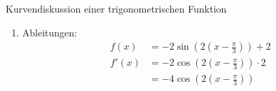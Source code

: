 \begin{bsp}{Kurvendiskussion einer trigonometrischen Funktion}{}
\begin{enumerate}
\begin{itemize}
\begin{equation*}
\begin{split}
            f(x) &= 0\\
            0 &=  -2\sin{(2(x-\frac{\pi}{3}))} +2 \hspace{0.5cm} | -2\\
            -2 &=  -2\sin{(2(x-\frac{\pi}{3}))}\hspace{0.5cm} | :(-2)\\
            1 &= \sin{(2(x-\frac{\pi}{3}))} \hspace{0.5cm} | \arcsin{ ()} \hspace{0.2cm} \text{siehe hierfür Merksatz \ref{SinCosEigenschaften}} \\ 
            \dfrac{1}{2}\pi +2\cdot k \pi &= 2(x-\frac{\pi}{3}) \hspace{0.5cm} | : 2\\
            \dfrac{1}{4}\pi +k\pi &= x-\frac{\pi}{3}\hspace{0.5cm}| + \frac{\pi}{3}\\
            \dfrac{7}{12} \pi +k\pi &= x \hspace{0.5cm}|\text{ mit } k\in \mathds{Z}
            \end{split}
            \end{equation*}
            Es folgt damit für die Nullstellen, dass alle $x_k=\dfrac{7}{12} \pi +k\pi$ mit $k\in \mathds{Z}$ die Nullstellengleichung erfüllen.
            \item Schnittpunkt mit der y-Achse
            \begin{equation*}
                \begin{split}
                    f(0) &= -2\sin{(2(0-\frac{\pi}{3}))} +2\\
                    &= -2\sin{(-2\frac{\pi}{3})} +2\\
                    &= -2\cdot( -\dfrac{\sqrt{3}}{2} )+2\\
                    &= \sqrt{3} +2 \approx 3,73
                \end{split}
            \end{equation*}
            \end{itemize}
            \item Ableitungen: \begin{equation*}
                \begin{split}
                    f(x) &= -2\sin{(2(x-\frac{\pi}{3}))} +2\\
                    f'(x) &= -2\cos{(2(x-\frac{\pi}{3}))} \cdot 2\\
                    &= -4\cos{(2(x-\frac{\pi}{3}))}\\

\end{split}
\end{equation*}
\end{enumerate}
\end{bsp}
